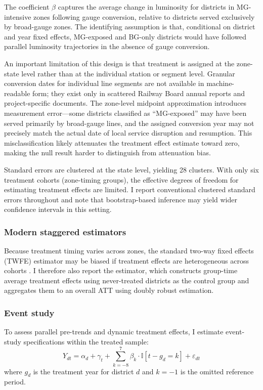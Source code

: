 \documentclass[12pt]{article}
\newcommand{\ind}{\mathbb{I}}
\begin{document}
The coefficient $\beta$ captures the average change in luminosity for districts in MG-intensive zones following gauge conversion, relative to districts served exclusively by broad-gauge zones. The identifying assumption is that, conditional on district and year fixed effects, MG-exposed and BG-only districts would have followed parallel luminosity trajectories in the absence of gauge conversion.

An important limitation of this design is that treatment is assigned at the zone-state level rather than at the individual station or segment level. Granular conversion dates for individual line segments are not available in machine-readable form; they exist only in scattered Railway Board annual reports and project-specific documents. The zone-level midpoint approximation introduces measurement error---some districts classified as ``MG-exposed'' may have been served primarily by broad-gauge lines, and the assigned conversion year may not precisely match the actual date of local service disruption and resumption. This misclassification likely attenuates the treatment effect estimate toward zero, making the null result harder to distinguish from attenuation bias.

Standard errors are clustered at the state level, yielding 28 clusters. With only six treatment cohorts (zone-timing groups), the effective degrees of freedom for estimating treatment effects are limited. I report conventional clustered standard errors throughout and note that bootstrap-based inference may yield wider confidence intervals in this setting.

\subsubsection*{Modern staggered estimators} Because treatment timing varies across zones, the standard two-way fixed effects (TWFE) estimator may be biased if treatment effects are heterogeneous across cohorts \citep{goodman2021difference, de2020two, sun2021estimating}. I therefore also report the \citet{callaway2021difference} estimator, which constructs group-time average treatment effects using never-treated districts as the control group and aggregates them to an overall ATT using doubly robust estimation.

\subsubsection*{Event study} To assess parallel pre-trends and dynamic treatment effects, I estimate event-study specifications within the treated sample:
\begin{equation}
Y_{dt} = \alpha_d + \gamma_t + \sum_{k=-8}^{7} \beta_k \cdot \ind[t - g_d = k] + \varepsilon_{dt}
\end{equation}
where $g_d$ is the treatment year for district $d$ and $k = -1$ is the omitted reference period.
\end{document}
